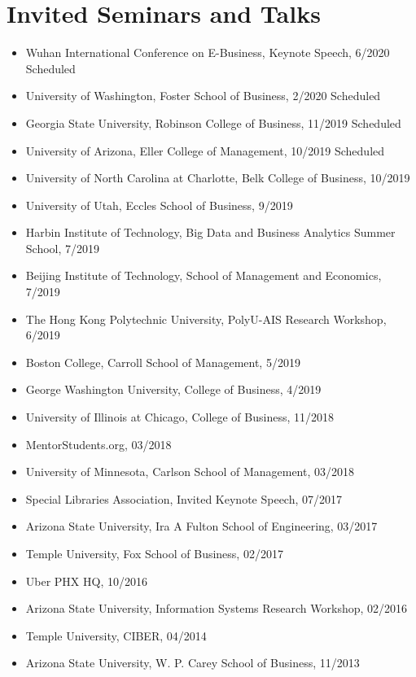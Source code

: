 \documentclass[paper=letter,fontsize=10pt]{scrartcl} %
\newcommand{\NewPart}[2]{\section*{{#1} #2}}
\newcommand{\TalkEntry}[3]{
		\noindent #1, #2 #3}
\begin{document}
\NewPart{Invited Seminars and Talks}{}
\begin{itemize}
\item \TalkEntry{Wuhan International Conference on E-Business, Keynote Speech}{6/2020}{Scheduled}
\item \TalkEntry{University of Washington, Foster School of Business}{2/2020}{Scheduled}
\item \TalkEntry{Georgia State University, Robinson College of Business}{11/2019}{Scheduled}
\item \TalkEntry{University of Arizona, Eller College of Management}{10/2019}{Scheduled}
\item \TalkEntry{University of North Carolina at Charlotte, Belk College of Business}{10/2019}{}
\item \TalkEntry{University of Utah, Eccles School of Business}{9/2019}{}
\item \TalkEntry{Harbin Institute of Technology, Big Data and Business Analytics Summer School}{7/2019}{}
\item \TalkEntry{Beijing Institute of Technology, School of Management and Economics}{7/2019}{}
\item \TalkEntry{The Hong Kong Polytechnic University, PolyU-AIS Research Workshop}{6/2019}{}
\item \TalkEntry{Boston College, Carroll School of Management}{5/2019}{}
\item \TalkEntry{George Washington University, College of Business}{4/2019}{}
\item \TalkEntry{University of Illinois at Chicago, College of Business}{11/2018}{}
\item \TalkEntry{MentorStudents.org}{03/2018}{}
\item \TalkEntry{University of Minnesota, Carlson School of Management}{03/2018}{}
\item \TalkEntry{Special Libraries Association, Invited Keynote Speech}{07/2017}{}
\item \TalkEntry{Arizona State University, Ira A Fulton School of Engineering}{03/2017}{}
\item \TalkEntry{Temple University, Fox School of Business}{02/2017}{}
\item \TalkEntry{Uber PHX HQ}{10/2016}{}
\item \TalkEntry{Arizona State University, Information Systems Research Workshop}{02/2016}{}
\item \TalkEntry{Temple University, CIBER}{04/2014}{}
\item \TalkEntry{Arizona State University, W. P. Carey School of Business}{11/2013}{}

\end{itemize}
\end{document}
